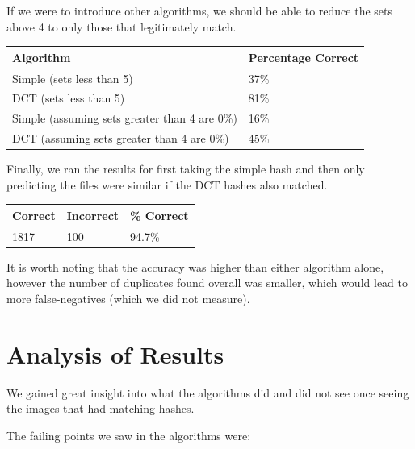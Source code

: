 \documentclass[11pt,a4paper,titlepage]{article}
\begin{document}
If we were to introduce other algorithms, we should be able to reduce the sets
above 4 to only those that legitimately match.

\begin{minipage}{\linewidth}
\centering
\begin{tabular}{|l|l|}
\hline
Algorithm                           & Percentage Correct \\ \hline
Simple (sets less than 5)                   & 37\%  \\ \hline
DCT (sets less than 5)                      & 81\%  \\ \hline
Simple (assuming sets greater than 4 are 0\%)  & 16\%  \\ \hline
DCT (assuming sets greater than 4 are 0\%)     & 45\%  \\ \hline
\end{tabular}
\end{minipage}

Finally, we ran the results for first taking the simple hash and then only
predicting the files were similar if the DCT hashes also matched.

\begin{minipage}{\linewidth}
\centering
\begin{tabular}{|l|l|l|}
\hline
Correct & Incorrect & \% Correct \\ \hline
1817    & 100      & 94.7\% \\ \hline
\end{tabular}
\end{minipage}

It is worth noting that the accuracy was higher than either algorithm alone,
however the number of duplicates found overall was smaller, which would lead to
more false-negatives (which we did not measure).

\section{Analysis of Results}

We gained great insight into what the algorithms did and did not see once
seeing the images that had matching hashes.

The failing points we saw in the algorithms were:
\end{document}
